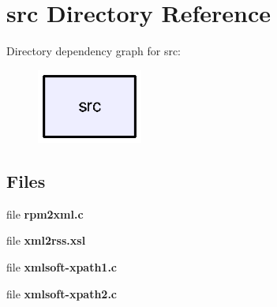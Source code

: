 \section{src Directory Reference}
\label{dir_68267d1309a1af8e8297ef4c3efbcdba}
Directory dependency graph for src\-:
\nopagebreak
\begin{figure}[H]
\begin{center}
\leavevmode
\includegraphics[width=98pt]{dir_68267d1309a1af8e8297ef4c3efbcdba_dep}
\end{center}
\end{figure}
\subsection*{Files}
\begin{DoxyCompactItemize}
\item 
file {\bfseries rpm2xml.\-c}
\item 
file {\bfseries xml2rss.\-xsl}
\item 
file {\bfseries xmlsoft-\/xpath1.\-c}
\item 
file {\bfseries xmlsoft-\/xpath2.\-c}
\end{DoxyCompactItemize}
